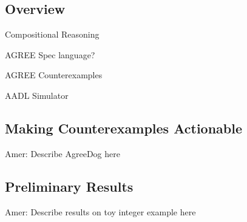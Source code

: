 \subsection{Overview}
Compositional Reasoning

AGREE Spec language?

AGREE Counterexamples

AADL Simulator

\subsection{Making Counterexamples Actionable}

Amer: Describe AgreeDog here

\subsection{Preliminary Results}

Amer: Describe results on toy integer example here